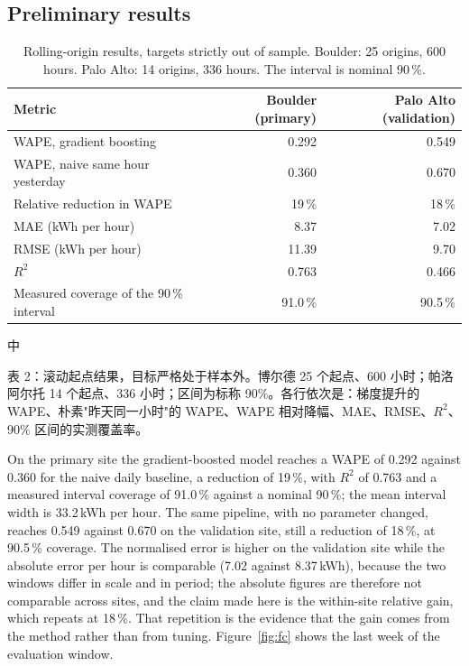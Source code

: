 \documentclass[10pt,a4paper]{article}
\newenvironment{zh}{%
  \par\vspace{1pt}%
  \begingroup
  \color{black!72}\small
  \setlength{\parskip}{0pt}%
  \noindent\textsf{\footnotesize 中}\hspace{3pt}\ignorespaces
}{%
  \par\endgroup\vspace{4pt}%
}
\begin{document}
\subsection{Preliminary results}

\begin{table}[H]
\centering
\caption{Rolling-origin results, targets strictly out of sample. Boulder: 25 origins, 600 hours.
Palo Alto: 14 origins, 336 hours. The interval is nominal 90\,\%.}
\label{tab:results}
\small
\renewcommand{\arraystretch}{1.15}
\begin{tabular}{@{}lrr@{}}
\toprule
Metric & Boulder (primary) & Palo Alto (validation) \\
\midrule
WAPE, gradient boosting & 0.292 & 0.549 \\
WAPE, naive same hour yesterday & 0.360 & 0.670 \\
Relative reduction in WAPE & 19\,\% & 18\,\% \\
MAE (kWh per hour) & 8.37 & 7.02 \\
RMSE (kWh per hour) & 11.39 & 9.70 \\
$R^2$ & 0.763 & 0.466 \\
Measured coverage of the 90\,\% interval & 91.0\,\% & 90.5\,\% \\
\bottomrule
\end{tabular}
\end{table}

\begin{zh}
表 2：滚动起点结果，目标严格处于样本外。博尔德 25 个起点、600 小时；帕洛阿尔托 14 个起点、336 小时；区间为标称 90\%。各行依次是：梯度提升的 WAPE、朴素"昨天同一小时"的 WAPE、WAPE 相对降幅、MAE、RMSE、$R^2$、90\% 区间的实测覆盖率。
\end{zh}

On the primary site the gradient-boosted model reaches a WAPE of 0.292 against 0.360 for the naive
daily baseline, a reduction of 19\,\%, with $R^2$ of 0.763 and a measured interval coverage of
91.0\,\% against a nominal 90\,\%; the mean interval width is 33.2\,kWh per hour. The same
pipeline, with no parameter changed, reaches 0.549 against 0.670 on the validation site, still a
reduction of 18\,\%, at 90.5\,\% coverage. The normalised error is higher on the validation site
while the absolute error per hour is comparable (7.02 against 8.37\,kWh), because the two windows
differ in scale and in period; the absolute figures are therefore not comparable across sites, and
the claim made here is the within-site relative gain, which repeats at 18\,\%. That repetition is
the evidence that the gain comes from the method rather than from tuning.
Figure~\ref{fig:fc} shows the last week of the evaluation window.
\end{document}
